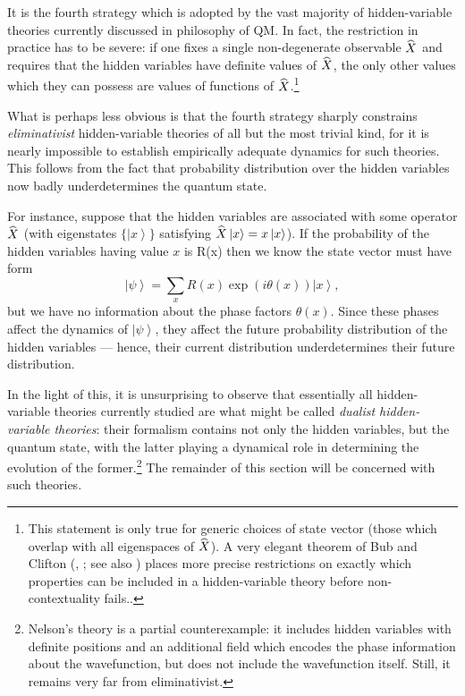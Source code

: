\documentclass[12pt]{article}
\newcommand{\be}{\begin{equation}}
\newcommand{\ee}{\end{equation}}
\newcommand{\ket}[1]{\ensuremath{\left|  #1 \right\rangle}}
\newcommand{\op}[1]{\ensuremath{\widehat{\textsf{\ensuremath{#1}}}}}
\begin{document}
It is the fourth strategy which is adopted by the vast majority of hidden-variable theories currently discussed in philosophy of QM. In fact, the restriction in practice has to be severe: if one fixes a single non-degenerate observable \op{X} and requires that the hidden variables have definite values of \op{X}, the only other values which they can possess are values of functions of \op{X}.\footnote{This statement is only true for generic choices of state vector (those which overlap with all eigenspaces of \op{X}). A very elegant theorem of Bub and Clifton (, ; see also ) places more precise restrictions on exactly which properties can be included in a hidden-variable theory before non-contextuality fails..}

What is perhaps less obvious  is that the fourth strategy sharply constrains \emph{eliminativist} hidden-variable theories of all but the most trivial kind, for it is nearly impossible to establish empirically adequate dynamics for such theories. This follows from the fact that probability distribution over the hidden variables now badly underdetermines the quantum state. 

For instance, suppose that the hidden variables are associated with some operator $\op{X}$ (with eigenstates $\{\ket{x}\}$ satisfying $\op{X}\ket{x}=x\ket{x}$). If the probability of the hidden variables having value $x$ is R(x) then we know the state vector must have form
\be
\ket{\psi}=\sum_x R(x)\exp(i \theta(x))\ket{x},
\ee
but we have no information about the phase factors $\theta(x)$. Since these phases affect the  dynamics of \ket{\psi}, they affect the future probability distribution of the hidden variables --- hence, their current distribution underdetermines their future distribution.

In the light of this, it is unsurprising to observe that essentially all hidden-variable theories currently studied are what might be called \emph{dualist hidden-variable theories}: their formalism contains not only the hidden variables, but the quantum state, with the latter playing a dynamical role in determining the evolution of the former.\footnote{Nelson's theory \cite{nelsonarticle,nelsonbook} is a partial counterexample: it includes hidden variables with definite positions and an additional field which encodes the phase information about the wavefunction, but does not include the wavefunction itself. Still, it remains very far from eliminativist.} The remainder of this section will be concerned with such theories.
\end{document}
